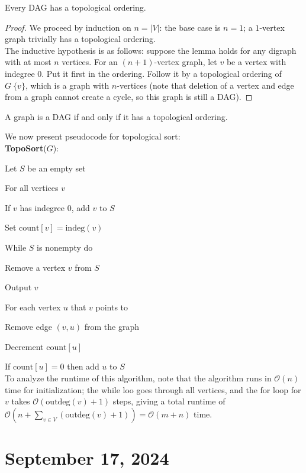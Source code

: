 \documentclass[12pt]{scrartcl}
\begin{document}
\begin{lemma}
    Every DAG has a topological ordering.
\end{lemma}

\begin{proof}
    We proceed by induction on $n=|V|$: the base case is $n=1$; a $1$-vertex graph trivially has a topological ordering. \\

    The inductive hypothesis is as follows: suppose the lemma holds for any digraph with at most $n$ vertices. For an $(n+1)$-vertex graph, let $v$ be a vertex with indegree $0$. Put it first in the ordering. Follow it by a topological ordering of $G \ \{v\}$, which is a graph with $n$-vertices (note that deletion of a vertex and edge from a graph cannot create a cycle, so this graph is still a DAG).
\end{proof}

\begin{theorem}
    A graph is a DAG if and only if it has a topological ordering.
\end{theorem}

We now present pseudocode for topological sort: \\

\textbf{TopoSort}($G$):

\hspace{2mm} Let $S$ be an empty set

\hspace{4mm} For all vertices $v$ 

\hspace{6mm} If $v$ has indegree $0$, add $v$ to $S$ 

\hspace{6mm} Set $\text{count}[v] = \text{indeg}(v)$

\hspace{4mm} While $S$ is nonempty do 

\hspace{6mm} Remove a vertex $v$ from $S$

\hspace{6mm} Output $v$

\hspace{6mm} For each vertex $u$ that $v$ points to

\hspace{8mm} Remove edge $(v, u)$ from the graph 

\hspace{8mm} Decrement $\text{count}[u]$

\hspace{8mm} If $\text{count}[u] = 0$ then add $u$ to $S$ \\

To analyze the runtime of this algorithm, note that the algorithm runs in $\mathcal{O}(n)$ time for initialization; the while loo goes through all vertices, and the for loop for $v$ takes $\mathcal{O}(\text{outdeg}(v)+1)$ steps, giving a total runtime of $\mathcal{O}(n + \sum_{v \in V} (\text{outdeg}(v)+1)) = \mathcal{O}(m+n)$ time. \\

\section{September 17, 2024}
\end{document}

